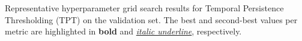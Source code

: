 \begin{table}[hbtp]
    \caption{Representative hyperparameter grid search results for Temporal Persistence Thresholding
    (TPT) on the validation set. The best and second-best values per metric are
    highlighted in \textbf{bold} and \underline{\textit{italic underline}},
    respectively.}
    \label{tb:gridsearch_tpt}
\end{table}
